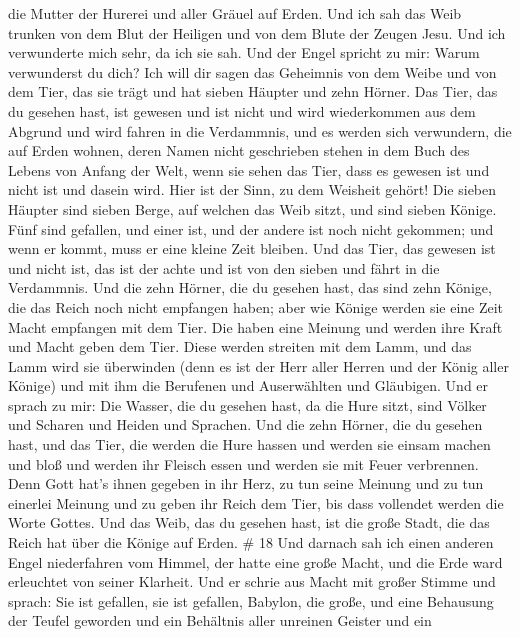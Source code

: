 die Mutter der Hurerei und aller Gräuel auf Erden.  Und ich
sah das Weib trunken von dem Blut der Heiligen und von dem Blute der
Zeugen Jesu. Und ich verwunderte mich sehr, da ich sie sah. 
Und der Engel spricht zu mir: Warum verwunderst du dich? Ich will dir
sagen das Geheimnis von dem Weibe und von dem Tier, das sie trägt und
hat sieben Häupter und zehn Hörner.  Das Tier, das du
gesehen hast, ist gewesen und ist nicht und wird wiederkommen aus dem
Abgrund und wird fahren in die Verdammnis, und es werden sich
verwundern, die auf Erden wohnen, deren Namen nicht geschrieben stehen
in dem Buch des Lebens von Anfang der Welt, wenn sie sehen das Tier,
dass es gewesen ist und nicht ist und dasein wird.  Hier ist
der Sinn, zu dem Weisheit gehört! Die sieben Häupter sind sieben Berge,
auf welchen das Weib sitzt, und sind sieben Könige.  Fünf
sind gefallen, und einer ist, und der andere ist noch nicht gekommen;
und wenn er kommt, muss er eine kleine Zeit bleiben.  Und
das Tier, das gewesen ist und nicht ist, das ist der achte und ist von
den sieben und fährt in die Verdammnis.  Und die zehn
Hörner, die du gesehen hast, das sind zehn Könige, die das Reich noch
nicht empfangen haben; aber wie Könige werden sie eine Zeit Macht
empfangen mit dem Tier.  Die haben eine Meinung und werden
ihre Kraft und Macht geben dem Tier.  Diese werden streiten
mit dem Lamm, und das Lamm wird sie überwinden (denn es ist der Herr
aller Herren und der König aller Könige) und mit ihm die Berufenen und
Auserwählten und Gläubigen.  Und er sprach zu mir: Die
Wasser, die du gesehen hast, da die Hure sitzt, sind Völker und Scharen
und Heiden und Sprachen.  Und die zehn Hörner, die du
gesehen hast, und das Tier, die werden die Hure hassen und werden sie
einsam machen und bloß und werden ihr Fleisch essen und werden sie mit
Feuer verbrennen.  Denn Gott hat's ihnen gegeben in ihr
Herz, zu tun seine Meinung und zu tun einerlei Meinung und zu geben ihr
Reich dem Tier, bis dass vollendet werden die Worte Gottes.
 Und das Weib, das du gesehen hast, ist die große Stadt,
die das Reich hat über die Könige auf Erden. \# 18  Und
darnach sah ich einen anderen Engel niederfahren vom Himmel, der hatte
eine große Macht, und die Erde ward erleuchtet von seiner Klarheit.
 Und er schrie aus Macht mit großer Stimme und sprach: Sie
ist gefallen, sie ist gefallen, Babylon, die große, und eine Behausung
der Teufel geworden und ein Behältnis aller unreinen Geister und ein

